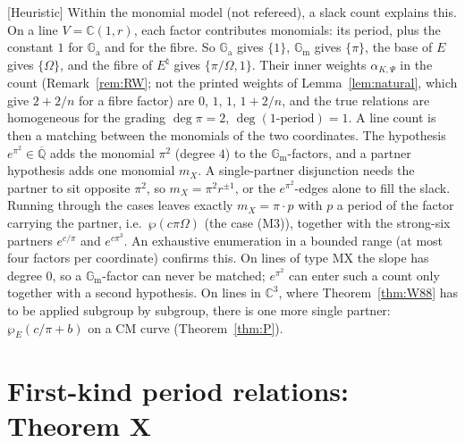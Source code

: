 \documentclass[11pt]{amsart}
\theoremstyle{definition}
\newcommand{\Qb}{\overline{\mathbb{Q}}}
\newcommand{\C}{\mathbb{C}}
\newcommand{\Ga}{\mathbb{G}_{\mathrm a}}
\newcommand{\Gm}{\mathbb{G}_{\mathrm m}}
\newcommand{\lab}[1]{\textup{[#1]}}
\begin{document}
\lab{Heuristic} Within the monomial model (not refereed), a slack count explains this. On a line $V=\C(1,r)$,
each factor contributes monomials: its period, plus the constant $1$ for $\Ga$ and for the fibre. So $\Ga$ gives $\{1\}$,
$\Gm$ gives $\{\pi\}$, the base of $E$ gives $\{\Omega\}$, and the fibre of $E^\natural$ gives $\{\pi/\Omega,1\}$. Their inner
weights $\alpha_{K,\Psi}$ in the count (Remark~\ref{rem:RW}; not the printed weights of Lemma~\ref{lem:natural}, which give
$2+2/n$ for a fibre factor) are $0$, $1$, $1$, $1+2/n$, and the true relations are homogeneous for the grading $\deg\pi=2$,
$\deg(\text{1-period})=1$. A line count is then a matching between the monomials of the two coordinates. The hypothesis
$e^{\pi^2}\in\Qb$ adds the monomial $\pi^2$ (degree $4$) to the $\Gm$-factors, and a partner hypothesis adds one monomial
$m_X$. A single-partner
disjunction needs the partner to sit opposite $\pi^2$, so $m_X=\pi^2r^{\pm1}$, or the $e^{\pi^2}$-edges alone to fill the
slack. Running through the cases leaves exactly $m_X=\pi\cdot p$ with $p$ a period of the factor carrying the partner, i.e.\
$\wp(c\pi\Omega)$ (the case (M3)), together with the strong-six partners $e^{c/\pi}$ and $e^{c\pi^3}$. An exhaustive
enumeration in a bounded range (at most four factors per coordinate) confirms this. On lines of type MX the slope has
degree $0$, so a $\Gm$-factor can never be matched; $e^{\pi^2}$ can enter such a count only together with a second hypothesis. On lines in $\C^3$, where
Theorem~\ref{thm:W88} has to be applied subgroup by subgroup, there is one more single partner: $\wp_E(c/\pi+b)$ on a CM
curve (Theorem~\ref{thm:P}).

\section{First-kind period relations: Theorem X}\label{sec:X}
\end{document}
